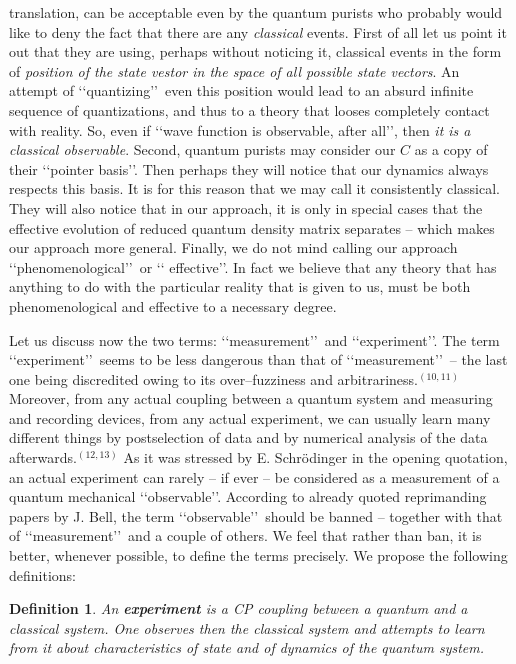 \documentclass[12pt]{article}
\def\lqq{\lq\lq}
\def\rqq{\rq\rq}
\begin{document}
translation, can be acceptable even by the quantum purists who probably
would like to deny the fact that there are any
{\sl classical} events. First of all let us point it out that they are using,
perhaps without noticing it, classical events  in the form of
{\sl position of the state vestor
in the space of all possible state vectors}. An attempt of
\lqq quantizing\rqq\,
even this position would lead to an absurd infinite sequence of
quantizations,
and thus to a theory that looses completely contact with reality.
So, even if \lqq wave function is observable, after all\rqq, then {\sl it
is a classical observable}.
Second, quantum purists may consider our $C$ as a copy of their
\lqq pointer basis\rqq. Then perhaps
they will notice that our dynamics always respects this basis. It is
for this reason that we may call it consistently classical.
They will also notice that in  our approach,  it is only in special
cases that the effective evolution of reduced quantum density
matrix separates -- which makes our approach more general. Finally,
we do not mind calling our approach \lqq phenomenological\rqq\,  or \lqq
effective\rqq.
In fact we believe that any theory that has anything to do with
the particular reality that is given to us, must be both phenomenological
and effective to a necessary degree.

Let us discuss now the two terms: \lqq measurement\rqq\,  and
\lqq experiment\rqq. The
term \lqq experiment\rqq\,  seems to be less dangerous than that of
\lqq measurement\rqq\,
-- the last one being discredited owing to its over--fuzziness and
ar\-bi\-tra\-ri\-ness.$^{(10,11)}$ Moreover, from any actual coupling
between a quantum system and measuring and recording devices, from any
actual experiment, we can usually learn many different things by
postselection of data and by numerical analysis of the data
afterwards.$^{(12,13)}$ As it was stressed by E. Schr\"odinger in the
opening quotation, an actual experiment can rarely -- if ever -- be
considered as a measurement of a quantum mechanical \lqq observable\rqq.
According to already quoted reprimanding papers by J. Bell, the term
\lqq observable\rqq\,  should be banned -- together with that of
\lqq measurement\rqq\,  and
a couple of others. We feel that rather than ban, it is better, whenever
possible, to define the terms precisely. We propose the following
definitions:
\newtheorem{definition}{Definition}
\begin{definition}
An {\bf experiment} is a CP coupling between a quantum and a classical
system. One observes then the classical system and attempts to learn
from it about characteristics of state and of dynamics of the quantum
system.
\end{definition}
\end{document}
